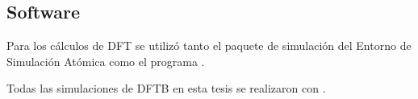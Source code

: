 \subsection{Software}

Para los cálculos de DFT se utilizó tanto el paquete de simulación  
\cite{enkovaara2010, mortensen2005} del Entorno de Simulación Atómica 
\cite{larsen2017} como el programa   
\cite{quantum_espresso, quantum_espresso_advanced}.

Todas las simulaciones de DFTB en esta tesis se realizaron con  
\cite{dftb+}.
